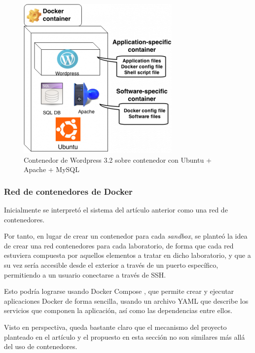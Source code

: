            \begin{figure}[htbp]
                \centering

                \includegraphics[scale=0.75]{images/Diagramas/Articulo.png}

                \caption{Contenedor de Wordpress 3.2 sobre contenedor con Ubuntu + Apache + MySQL}
                \label{fig:articulo}
            \end{figure}

            \newpage
            
            \subsubsection{Red de contenedores de Docker}

                Inicialmente se interpretó el sistema del artículo anterior como una red de contenedores.
                
                Por tanto, en lugar de crear un contenedor para cada \textit{sandbox}, se planteó la idea de crear una red contenedores para cada laboratorio, de forma que cada red estuviera compuesta por aquellos elementos a tratar en dicho laboratorio, y que a su vez sería accesible desde el exterior a través de un puerto específico, permitiendo a un usuario conectarse a través de SSH.

                Esto podría lograrse usando Docker Compose \cite{docker-compose}, que permite crear y ejecutar aplicaciones Docker de forma sencilla, usando un archivo YAML que describe los servicios que componen la aplicación, así como las dependencias entre ellos.

                Visto en perspectiva, queda bastante claro que el mecanismo del proyecto planteado en el artículo y el propuesto en esta sección no son similares más allá del uso de contenedores.
                
